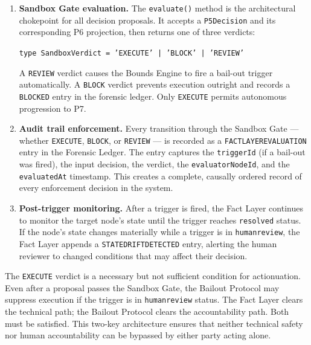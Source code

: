 \begin{enumerate}
  \item \textbf{Sandbox Gate evaluation.} The \texttt{evaluate()} method is the architectural chokepoint for all decision proposals. It accepts a \texttt{P5Decision} and its corresponding P6 projection, then returns one of three verdicts:

\medskip
\noindent
\texttt{type\ SandboxVerdict\ =\ 'EXECUTE'\ |\ 'BLOCK'\ |\ 'REVIEW'}

\medskip
\noindent
A \texttt{REVIEW} verdict causes the Bounds Engine to fire a bail-out trigger automatically. A \texttt{BLOCK} verdict prevents execution outright and records a \texttt{BLOCKED} entry in the forensic ledger. Only \texttt{EXECUTE} permits autonomous progression to P7.

  \item \textbf{Audit trail enforcement.} Every transition through the Sandbox Gate --- whether \texttt{EXECUTE}, \texttt{BLOCK}, or \texttt{REVIEW} --- is recorded as a \texttt{FACT\textunderscore LAYER\textunderscore EVALUATION} entry in the Forensic Ledger. The entry captures the \texttt{triggerId} (if a bail-out was fired), the input decision, the verdict, the \texttt{evaluatorNodeId}, and the \texttt{evaluatedAt} timestamp. This creates a complete, causally ordered record of every enforcement decision in the system.

  \item \textbf{Post-trigger monitoring.} After a trigger is fired, the Fact Layer continues to monitor the target node's state until the trigger reaches \texttt{resolved} status. If the node's state changes materially while a trigger is in \texttt{human\textunderscore review}, the Fact Layer appends a \texttt{STATE\textunderscore DRIFT\textunderscore DETECTED} entry, alerting the human reviewer to changed conditions that may affect their decision.
\end{enumerate}

The \texttt{EXECUTE} verdict is a necessary but not sufficient condition for actionuation. Even after a proposal passes the Sandbox Gate, the Bailout Protocol may suppress execution if the trigger is in \texttt{human\textunderscore review} status. The Fact Layer clears the technical path; the Bailout Protocol clears the accountability path. Both must be satisfied. This two-key architecture ensures that neither technical safety nor human accountability can be bypassed by either party acting alone.

